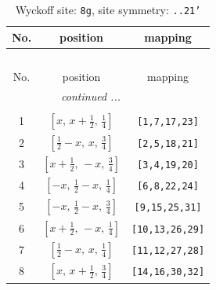 \documentclass[fleqn,8pt]{jsarticle}
\begin{document}
\begin{longtable}{ccc}
\caption{Wyckoff site: {\tt 8g}, site symmetry: {\tt ..21'}}
 \\
 \hline \hline
No. & position & mapping \\ \hline \endfirsthead

\multicolumn{2}{l}{\tablename\ \thetable{}} \\
 \hline \hline
No. & position & mapping \\ \hline \endhead

 \hline \hline
\multicolumn{2}{r}{\footnotesize\it continued ...} \\ \endfoot

 \hline \hline
\multicolumn{2}{r}{} \\ \endlastfoot

1 & $\left[ x,\, x + \frac{1}{2},\, \frac{1}{4} \right]$ & {\tt [1,7,17,23]} \\ \hline
2 & $\left[ \frac{1}{2} - x,\, x,\, \frac{3}{4} \right]$ & {\tt [2,5,18,21]} \\ \hline
3 & $\left[ x + \frac{1}{2},\, - x,\, \frac{3}{4} \right]$ & {\tt [3,4,19,20]} \\ \hline
4 & $\left[ - x,\, \frac{1}{2} - x,\, \frac{1}{4} \right]$ & {\tt [6,8,22,24]} \\ \hline
5 & $\left[ - x,\, \frac{1}{2} - x,\, \frac{3}{4} \right]$ & {\tt [9,15,25,31]} \\ \hline
6 & $\left[ x + \frac{1}{2},\, - x,\, \frac{1}{4} \right]$ & {\tt [10,13,26,29]} \\ \hline
7 & $\left[ \frac{1}{2} - x,\, x,\, \frac{1}{4} \right]$ & {\tt [11,12,27,28]} \\ \hline
8 & $\left[ x,\, x + \frac{1}{2},\, \frac{3}{4} \right]$ & {\tt [14,16,30,32]} \\
\end{longtable}
\renewcommand{\arraystretch}{1.2}
\end{document}
